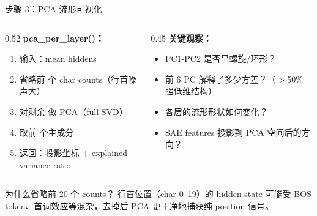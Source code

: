 \begin{frame}{步骤 3：PCA 流形可视化}
\small
\begin{columns}[T,onlytextwidth]
\begin{column}{0.52\linewidth}
\textbf{pca\_per\_layer()：}
\begin{enumerate}
  \item 输入：mean hiddens \code{[151, H]}
  \item 省略前  个 char counts（行首噪声大）
  \item 对剩余 \code{[131, H]} 做 PCA（full SVD）
  \item 取前  个主成分
  \item 返回：投影坐标 \code{[151, 6]} + explained variance ratio
\end{enumerate}
\end{column}
\begin{column}{0.45\linewidth}
\textbf{关键观察：}
\begin{itemize}
  \item PC1-PC2 是否呈螺旋/环形？
  \item 前 6 PC 解释了多少方差？（$>$50\% = 强低维结构）
  \item 各层的流形形状如何变化？
  \item SAE features 投影到 PCA 空间后的方向？
\end{itemize}
\end{column}
\end{columns}

\vspace{0.4em}
\begin{block}{为什么省略前 20 个 counts？}
行首位置（char 0--19）的 hidden state 可能受 BOS token、首词效应等混杂，去掉后 PCA 更干净地捕获纯 position 信号。
\end{block}
\end{frame}

